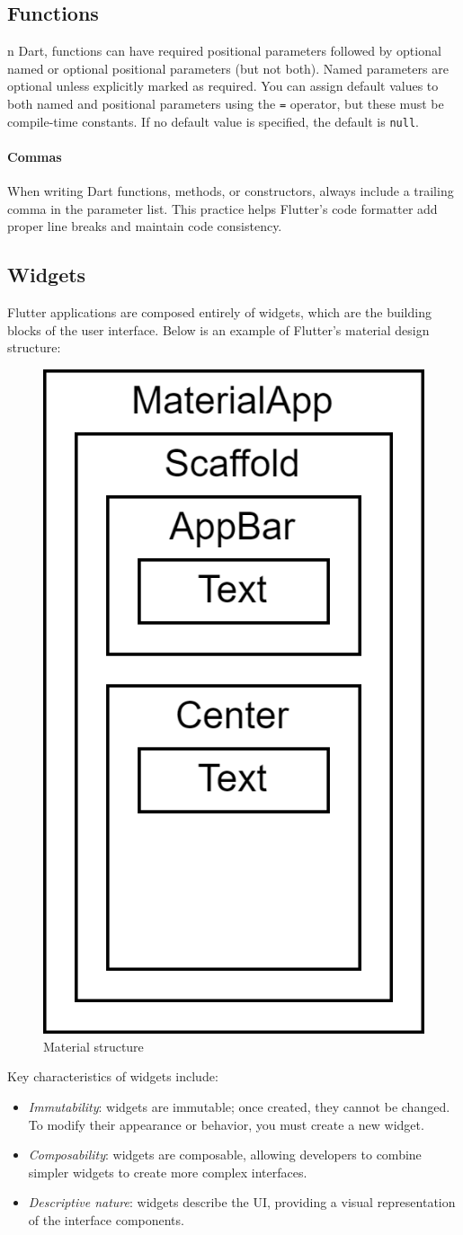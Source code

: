 \subsection{Functions}
n Dart, functions can have required positional parameters followed by optional named or optional positional parameters (but not both). 
Named parameters are optional unless explicitly marked as required. 
You can assign default values to both named and positional parameters using the \texttt{=} operator, but these must be compile-time constants. 
If no default value is specified, the default is \texttt{null}.

\paragraph*{Commas}
When writing Dart functions, methods, or constructors, always include a trailing comma in the parameter list. 
This practice helps Flutter's code formatter add proper line breaks and maintain code consistency.

\subsection{Widgets}
Flutter applications are composed entirely of widgets, which are the building blocks of the user interface. 
Below is an example of Flutter's material design structure:
\begin{figure}[H]
    \centering
    \includegraphics[width=0.25\linewidth]{images/material.png}
    \caption{Material structure}
\end{figure}
Key characteristics of widgets include:
\begin{itemize}
    \item \textit{Immutability}: widgets are immutable; once created, they cannot be changed. To modify their appearance or behavior, you must create a new widget.
    \item \textit{Composability}: widgets are composable, allowing developers to combine simpler widgets to create more complex interfaces.
    \item \textit{Descriptive nature}: widgets describe the UI, providing a visual representation of the interface components.
\end{itemize}

